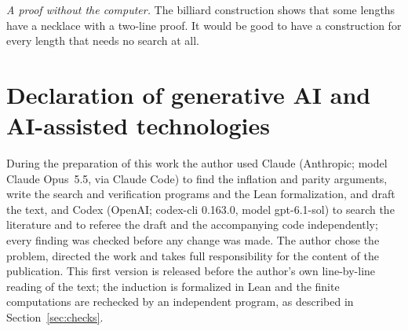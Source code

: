 \documentclass[11pt]{article}
\theoremstyle{definition}
\theoremstyle{remark}
\begin{document}
\emph{A proof without the computer.} The billiard construction shows that some lengths have a
necklace with a two-line proof. It would be good to have a construction for every length that
needs no search at all.

\section*{Declaration of generative AI and AI-assisted technologies}

During the preparation of this work the author used Claude (Anthropic; model Claude Opus~5.5, via Claude Code) to
find the inflation and parity arguments, write the search and verification programs and the Lean formalization, and
draft the text, and Codex (OpenAI; codex-cli 0.163.0, model gpt-6.1-sol) to search the literature and to referee the
draft and the accompanying code independently; every finding was checked before any change was made. The author
chose the problem, directed the work and takes full responsibility for the content of the publication. This first
version is released before the author's own line-by-line reading of the text; the induction is formalized in Lean
and the finite computations are rechecked by an independent program, as described in Section~\ref{sec:checks}.
\end{document}
